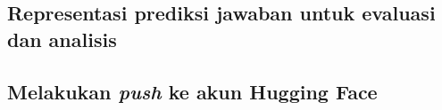 \subsection{Representasi prediksi jawaban untuk evaluasi dan analisis}

\subsection{Melakukan \emph{push} ke akun Hugging Face}
